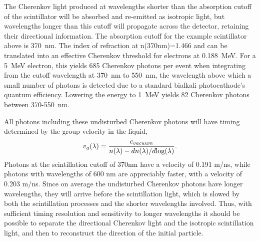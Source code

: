 \documentclass[cits]{JINST}
\begin{document}
The Cherenkov light produced at wavelengths shorter than the
absorption cutoff of the scintillator will be absorbed and re-emitted
as isotropic light, but wavelengths longer than this cutoff will
propagate across the detector, retaining their directional
information. The absorption cutoff for the example scintillator above is 370~nm. The index of refraction at  n(370nm)=1.466 and can be translated into an effective Cherenkov threshold for electrons at 0.188~MeV. For a 5~MeV electron, this yields 685 Cherenkov photons per event when integrating from the cutoff wavelength at 370~nm to 550~nm,  the wavelength above which a small number of photons is detected due to a standard bialkali photocathode's quantum efficiency. Lowering the energy to 1~MeV yields 82 Cherenkov photons between 370-550~nm.


All photons including these undisturbed Cherenkov
photons will have timing determined by the group 
velocity\cite{group_velocity_article,pdg_review_2012,tamm1939} in the liquid,
\begin{equation}
\label{eqGroup}
v_{g}(\lambda) = \frac{c_{vacuum}}{n(\lambda) - dn(\lambda)/d\textnormal{log}(\lambda)}.
\end{equation}
Photons at the scintillation cutoff of 370nm have a velocity of 0.191 m/ns, while photons with wavelengths of 600 nm are appreciably faster, with a velocity of 0.203 m/ns. Since on average the undisturbed Cherenkov photons have longer wavelengths, they will arrive before the
scintillation light, which is slowed by both the scintillation
processes and the shorter wavelengths involved. Thus, with sufficient
timing resolution and sensitivity to longer wavelengths it should be
possible to separate the directional Cherenkov light and the isotropic
scintillation light, and then to reconstruct the direction of the
initial particle.
\end{document}
